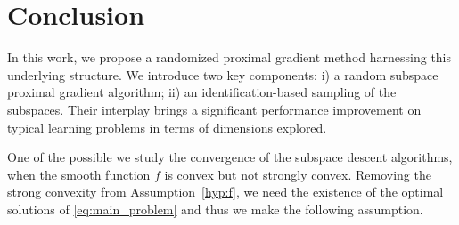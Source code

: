 \section{Conclusion}\label{sec:mor-conclusion}
{\color{blue} In this work, we propose a randomized proximal gradient method harnessing this underlying structure. We introduce two key components: i) a random subspace proximal gradient algorithm; ii) an identification-based sampling of the subspaces. Their interplay brings a significant performance improvement on typical learning problems in terms of dimensions explored.

One of the possible we study the convergence of the subspace descent algorithms, when the smooth function $f$ is convex but not strongly convex. Removing the strong convexity from Assumption~\ref{hyp:f}, we need the existence of the optimal solutions of \eqref{eq:main_problem} and thus we make the following assumption.

}